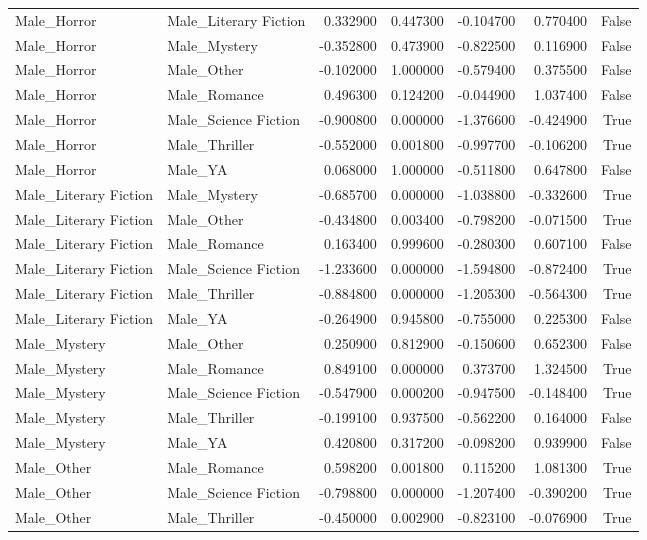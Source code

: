 \begin{tabular}{llrrrrr}
Male_Horror & Male_Literary Fiction & 0.332900 & 0.447300 & -0.104700 & 0.770400 & False \\
Male_Horror & Male_Mystery & -0.352800 & 0.473900 & -0.822500 & 0.116900 & False \\
Male_Horror & Male_Other & -0.102000 & 1.000000 & -0.579400 & 0.375500 & False \\
Male_Horror & Male_Romance & 0.496300 & 0.124200 & -0.044900 & 1.037400 & False \\
Male_Horror & Male_Science Fiction & -0.900800 & 0.000000 & -1.376600 & -0.424900 & True \\
Male_Horror & Male_Thriller & -0.552000 & 0.001800 & -0.997700 & -0.106200 & True \\
Male_Horror & Male_YA & 0.068000 & 1.000000 & -0.511800 & 0.647800 & False \\
Male_Literary Fiction & Male_Mystery & -0.685700 & 0.000000 & -1.038800 & -0.332600 & True \\
Male_Literary Fiction & Male_Other & -0.434800 & 0.003400 & -0.798200 & -0.071500 & True \\
Male_Literary Fiction & Male_Romance & 0.163400 & 0.999600 & -0.280300 & 0.607100 & False \\
Male_Literary Fiction & Male_Science Fiction & -1.233600 & 0.000000 & -1.594800 & -0.872400 & True \\
Male_Literary Fiction & Male_Thriller & -0.884800 & 0.000000 & -1.205300 & -0.564300 & True \\
Male_Literary Fiction & Male_YA & -0.264900 & 0.945800 & -0.755000 & 0.225300 & False \\
Male_Mystery & Male_Other & 0.250900 & 0.812900 & -0.150600 & 0.652300 & False \\
Male_Mystery & Male_Romance & 0.849100 & 0.000000 & 0.373700 & 1.324500 & True \\
Male_Mystery & Male_Science Fiction & -0.547900 & 0.000200 & -0.947500 & -0.148400 & True \\
Male_Mystery & Male_Thriller & -0.199100 & 0.937500 & -0.562200 & 0.164000 & False \\
Male_Mystery & Male_YA & 0.420800 & 0.317200 & -0.098200 & 0.939900 & False \\
Male_Other & Male_Romance & 0.598200 & 0.001800 & 0.115200 & 1.081300 & True \\
Male_Other & Male_Science Fiction & -0.798800 & 0.000000 & -1.207400 & -0.390200 & True \\
Male_Other & Male_Thriller & -0.450000 & 0.002900 & -0.823100 & -0.076900 & True \\

\end{tabular}
